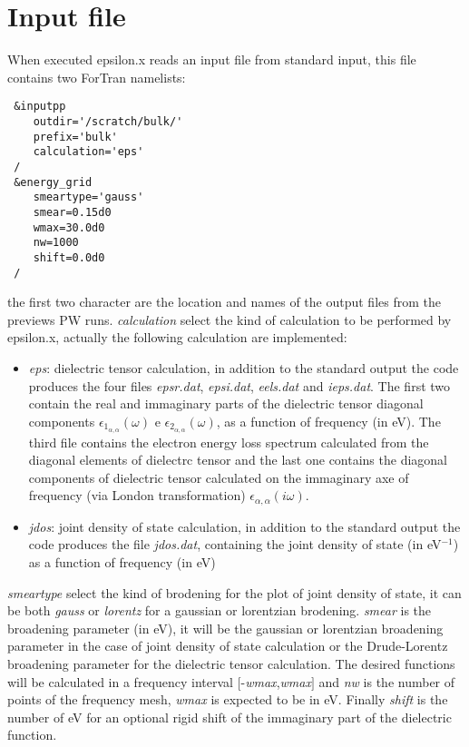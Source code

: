 \documentclass[twocolumn]{article}
\begin{document}
\section{Input file}
When executed epsilon.x reads an input file from standard input, this file contains two ForTran namelists:
\begin{verbatim}
 &inputpp
    outdir='/scratch/bulk/'
    prefix='bulk'
    calculation='eps' 
 /
 &energy_grid 
    smeartype='gauss'
    smear=0.15d0
    wmax=30.0d0
    nw=1000
    shift=0.0d0
 / 
\end{verbatim} 
the first two character are the location and names of the output files from the previews PW runs. \emph{calculation}
select the kind of calculation to be performed by epsilon.x, actually the following calculation are implemented:
\begin{itemize}
\item  \emph{eps}: dielectric tensor calculation, in addition to the standard output the code produces the four files
\emph{epsr.dat}, \emph{epsi.dat}, \emph{eels.dat} and \emph{ieps.dat}. The first two contain the real and immaginary 
parts of the dielectric
tensor diagonal components $\epsilon_{1_{\alpha,\alpha}}(\omega)$ e $\epsilon_{2_{\alpha,\alpha}}(\omega)$, 
as a function of frequency (in eV). The third file contains the electron energy loss spectrum calculated from the diagonal 
elements of dielectrc tensor and the last one contains the diagonal components of 
dielectric tensor calculated on the immaginary axe of frequency (via London transformation) 
$\epsilon_{\alpha,\alpha}(i\omega)$. 
\item  \emph{jdos}: joint density of state calculation, in addition to the standard output the code produces the file
\emph{jdos.dat}, containing the joint density of state (in eV$^{-1}$) as a function of frequency (in eV)
\end{itemize}
\emph{smeartype} select the kind of brodening for the plot of joint density of state, it can be both
\emph{gauss} or \emph{lorentz} for a gaussian or lorentzian brodening. \emph{smear} is the broadening parameter (in eV), 
it will be the gaussian or lorentzian broadening parameter in the case of joint density of state calculation or the 
Drude-Lorentz broadening parameter for the dielectric tensor calculation.
The desired functions will be calculated in a frequency interval $\big[$-\emph{wmax},\emph{wmax}$\big]$ and \emph{nw} 
is the number of points of the frequency mesh, \emph{wmax} is expected to be in eV. Finally \emph{shift} is the number 
of eV for an optional rigid shift of the immaginary part of the dielectric function. 
   
\end{document}
